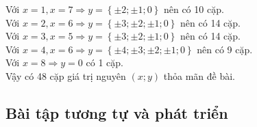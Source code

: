 \begin{khung}
\begin{vd}
{Với $x=1,x=7\Rightarrow y=\left\{\pm 2;\pm 1;0\right\}$ nên có 10 cặp.\\
Với $x=2,x=6\Rightarrow y=\left\{\pm 3;\pm 2;\pm 1;0\right\}$ nên có 14 cặp.\\
Với $x=3,x=5\Rightarrow y=\left\{\pm 3;\pm 2;\pm 1;0\right\}$ nên có 14 cặp.\\
Với $x=4,x=6\Rightarrow y=\left\{\pm 4;\pm 3;\pm 2;\pm 1;0\right\}$ nên có 9 cặp.\\
Với $x=8\Rightarrow y=0$ có 1 cặp.\\
Vậy có 48 cặp giá trị nguyên $(x;y)$ thỏa mãn đề bài.
	}
	\end{vd}
\end{khung}
\subsection{Bài tập tương tự và phát triển}
